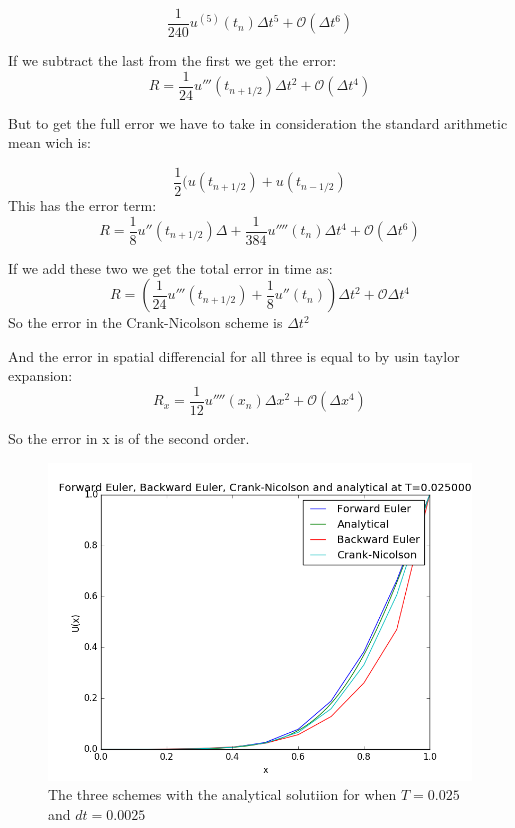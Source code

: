 \documentclass[a4paper,10pt]{article}
\begin{document}
\[  \frac{1}{240} u^{(5)} (t_n) \Delta t^5 + \mathcal{O}(\Delta t^6) \]


If we subtract the last from the first we get the error:
\begin{equation}
 R = \frac{1}{24}u'''(t_{n+1/2})\Delta t^2 + \mathcal{O}(\Delta t^4)
\end{equation}

But to get the full error we have to take in consideration the standard arithmetic mean wich is:

\begin{equation}
 \frac{1}{2}(u(t_{n+1/2}) + u(t_{n - 1/2}) 
\end{equation}
This has the error term:
\begin{equation}
 R = \frac{1}{8}u''(t_{n+1/2})\Delta + \frac{1}{384}u''''(t_n)\Delta t^4 + \mathcal{O}(\Delta t^6)
\end{equation}

If we add these two we get the total error in time as:
\begin{equation}
 R = (\frac{1}{24} u'''(t_{n+1/2}) + \frac{1}{8}u''(t_n)) \Delta t^2 + \mathcal{O}\Delta t^4 
\end{equation}
So the error in the Crank-Nicolson scheme is $\Delta t^2$

And the error in spatial differencial for all three is equal to by usin taylor expansion:
\begin{equation}
 R_x = \frac{1}{12}u''''(x_n) \Delta x^2 + \mathcal{O}(\Delta x^4)
\end{equation}

So the error in x is of the second order.

\begin{figure}
  \includegraphics[scale=0.5]{alldt025analyticalt1}
    \caption{The three schemes with the analytical solutiion for when $T = 0.025$ and $dt = 0.0025$}
    \label{fig:NumAna0025}
\end{figure}
\end{document}
